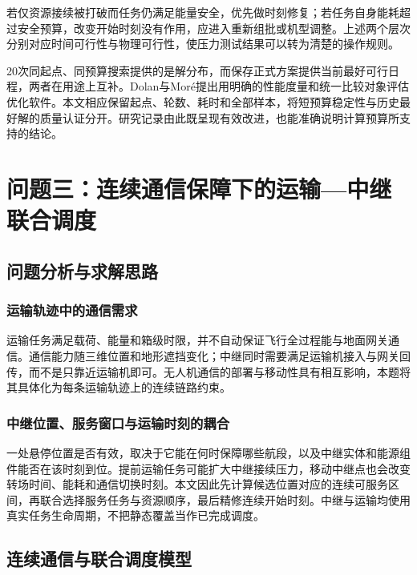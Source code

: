 \documentclass[withoutpreface,colorprint]{format}
\numberwithin{equation}{section}
\numberwithin{figure}{section}
\numberwithin{table}{section}
\begin{document}
若仅资源接续被打破而任务仍满足能量安全，优先做时刻修复；若任务自身能耗超过安全预算，改变开始时刻没有作用，应进入重新组批或机型调整。上述两个层次分别对应时间可行性与物理可行性，使压力测试结果可以转为清楚的操作规则。

20次同起点、同预算搜索提供的是解分布，而保存正式方案提供当前最好可行日程，两者在用途上互补。Dolan与Moré提出用明确的性能度量和统一比较对象评估优化软件\cite{dolan2002}。本文相应保留起点、轮数、耗时和全部样本，将短预算稳定性与历史最好解的质量认证分开。研究记录由此既呈现有效改进，也能准确说明计算预算所支持的结论。



\section{问题三：连续通信保障下的运输—中继联合调度}
\label{sec:q3}

\subsection{问题分析与求解思路}
\subsubsection{运输轨迹中的通信需求}
运输任务满足载荷、能量和箱级时限，并不自动保证飞行全过程能与地面网关通信。通信能力随三维位置和地形遮挡变化；中继同时需要满足运输机接入与网关回传，而不是只靠近运输机即可。无人机通信的部署与移动性具有相互影响\cite{zeng2016uavcom,zeng2019sky}，本题将其具体化为每条运输轨迹上的连续链路约束。

\subsubsection{中继位置、服务窗口与运输时刻的耦合}
一处悬停位置是否有效，取决于它能在何时保障哪些航段，以及中继实体和能源组件能否在该时刻到位。提前运输任务可能扩大中继接续压力，移动中继点也会改变转场时间、能耗和通信切换时刻。本文因此先计算候选位置对应的连续可服务区间，再联合选择服务任务与资源顺序，最后精修连续开始时刻。中继与运输均使用真实任务生命周期，不把静态覆盖当作已完成调度。

\subsection{连续通信与联合调度模型}
\end{document}
